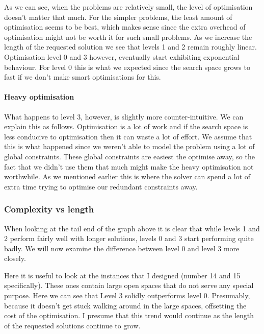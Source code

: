 \documentclass[british]{article}
\begin{document}
	As we can see, when the problems are relatively small, the level of optimisation doesn't matter that much. For the simpler problems, the least amount of optimisation seems to be best, which makes sense since the extra overhead of optimisation might not be worth it for such small problems. As we increase the length of the requested solution we see that levels 1 and 2 remain roughly linear. Optimisation level 0 and 3 however, eventually start exhibiting exponential behaviour. For level 0 this is what we expected since the search space grows to fast if we don't make smart optimisations for this.
	
	\paragraph{Heavy optimisation} What happens to level 3, however, is slightly more counter-intuitive. We can explain this as follows. Optimisation is a lot of work and if the search space is less conducive to optimisation then it can waste a lot of effort. We assume that this is what happened since we weren't able to model the problem using a lot of global constraints. These global constraints are easiest the optimise away, so the fact that we didn't use them that much might make the heavy optimisation not worthwhile. As we mentioned earlier this is where the solver can spend a lot of extra time trying to optimise our redundant constraints away. 
	
	\subsubsection{Complexity vs length} 
	
	When looking at the tail end of the graph above it is clear that while levels 1 and 2 perform fairly well with longer solutions, levels 0 and 3 start performing quite badly. We will now examine the difference between level 0 and level 3 more closely. 
	
	Here it is useful to look at the instances that I designed (number 14 and 15 specifically). These ones contain large open spaces that do not serve any special purpose. Here we can see that Level 3 solidly outperforms level 0. Presumably, because it doesn't get stuck walking around in the large spaces, offsetting the cost of the optimisation. I presume that this trend would continue as the length of the requested solutions continue to grow. 
	
\end{document}
